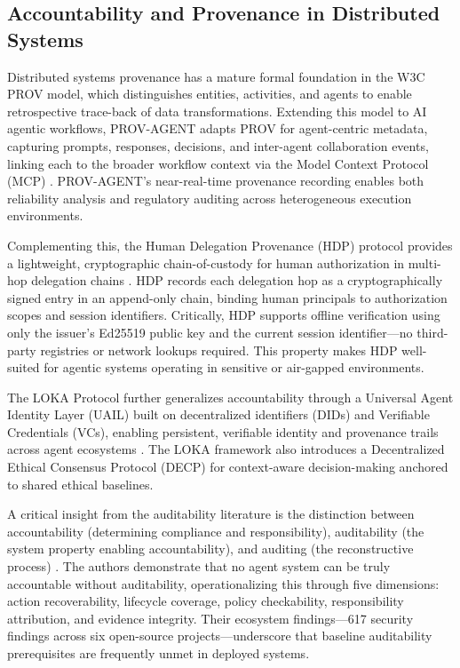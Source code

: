 \subsection{Accountability and Provenance in Distributed Systems}

Distributed systems provenance has a mature formal foundation in the W3C PROV model, which distinguishes entities, activities, and agents to enable retrospective trace-back of data transformations. Extending this model to AI agentic workflows, PROV-AGENT adapts PROV for agent-centric metadata, capturing prompts, responses, decisions, and inter-agent collaboration events, linking each to the broader workflow context via the Model Context Protocol (MCP) \cite{prov-agent}. PROV-AGENT's near-real-time provenance recording enables both reliability analysis and regulatory auditing across heterogeneous execution environments.

Complementing this, the Human Delegation Provenance (HDP) protocol provides a lightweight, cryptographic chain-of-custody for human authorization in multi-hop delegation chains \cite{hdp-protocol}. HDP records each delegation hop as a cryptographically signed entry in an append-only chain, binding human principals to authorization scopes and session identifiers. Critically, HDP supports offline verification using only the issuer's Ed25519 public key and the current session identifier---no third-party registries or network lookups required. This property makes HDP well-suited for agentic systems operating in sensitive or air-gapped environments.

The LOKA Protocol further generalizes accountability through a Universal Agent Identity Layer (UAIL) built on decentralized identifiers (DIDs) and Verifiable Credentials (VCs), enabling persistent, verifiable identity and provenance trails across agent ecosystems \cite{loka-protocol}. The LOKA framework also introduces a Decentralized Ethical Consensus Protocol (DECP) for context-aware decision-making anchored to shared ethical baselines.

A critical insight from the auditability literature is the distinction between accountability (determining compliance and responsibility), auditability (the system property enabling accountability), and auditing (the reconstructive process) \cite{agent-auditability}. The authors demonstrate that no agent system can be truly accountable without auditability, operationalizing this through five dimensions: action recoverability, lifecycle coverage, policy checkability, responsibility attribution, and evidence integrity. Their ecosystem findings---617 security findings across six open-source projects---underscore that baseline auditability prerequisites are frequently unmet in deployed systems.

